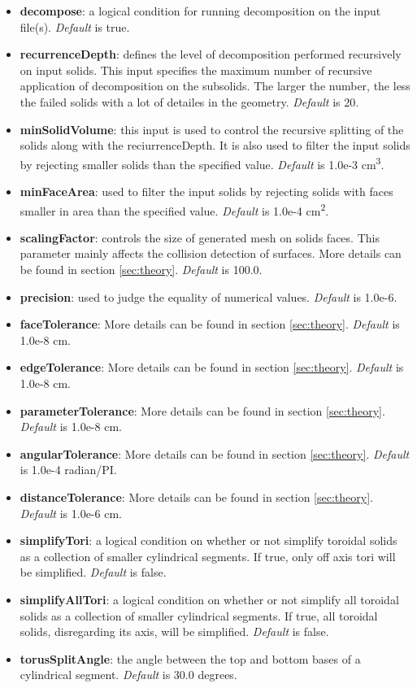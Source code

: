 \documentclass[12pt, a4paper, titlepage]{article}
\begin{document}
	\begin{itemize}
	  \item \textbf{decompose}: a logical condition for running decomposition on the input file(s). \emph{Default} is true.
	  \item \textbf{recurrenceDepth}: defines the level of decomposition performed recursively on input solids. This input specifies the maximum number of recursive application of decomposition on the subsolids. The larger the number, the less the failed solids with a lot of detailes in the geometry. \emph{Default} is 20.
	  \item \textbf{minSolidVolume}: this input is used to control the recursive splitting of the solids along with the reciurrenceDepth. It is also used to filter the input solids by rejecting smaller solids than the specified value. \emph{Default} is 1.0e-3 cm\textsuperscript{3}.
	  \item \textbf{minFaceArea}: used to filter the input solids by rejecting solids with faces smaller in area than the specified value. \emph{Default} is 1.0e-4 cm\textsuperscript{2}.
	  \item \textbf{scalingFactor}: controls the size of generated mesh on solids faces. This parameter mainly affects the collision detection of surfaces. More details can be found in section \ref{sec:theory}. \emph{Default} is 100.0.
	  \item \textbf{precision}: used to judge the equality of numerical values. \emph{Default} is 1.0e-6.
	  \item \textbf{faceTolerance}: More details can be found in section \ref{sec:theory}. \emph{Default} is 1.0e-8 cm.
	  \item \textbf{edgeTolerance}: More details can be found in section \ref{sec:theory}. \emph{Default} is 1.0e-8 cm.
	  \item \textbf{parameterTolerance}: More details can be found in section \ref{sec:theory}. \emph{Default} is 1.0e-8 cm.
	  \item \textbf{angularTolerance}: More details can be found in section \ref{sec:theory}. \emph{Default} is 1.0e-4 radian/PI.
	  \item \textbf{distanceTolerance}: More details can be found in section \ref{sec:theory}. \emph{Default} is 1.0e-6 cm.
	  \item \textbf{simplifyTori}: a logical condition on whether or not simplify toroidal solids as a collection of smaller cylindrical segments. If true, only off axis tori will be simplified. \emph{Default} is false.
	  \item \textbf{simplifyAllTori}: a logical condition on whether or not simplify all toroidal solids as a collection of smaller cylindrical segments. If true, all toroidal solids, disregarding its axis, will be simplified. \emph{Default} is false.
	  \item \textbf{torusSplitAngle}: the angle between the top and bottom bases of a cylindrical segment. \emph{Default} is 30.0 degrees.
    \end{itemize}
\end{document}
